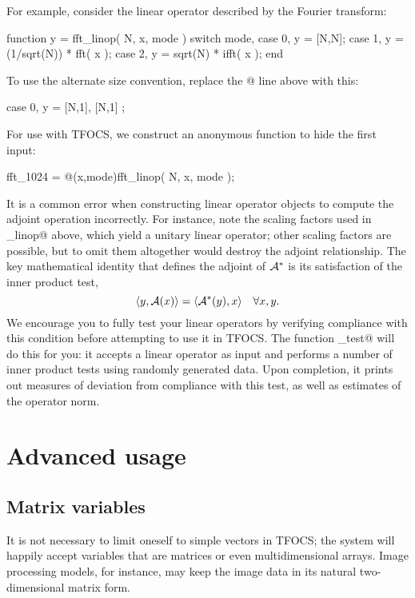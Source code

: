 \documentclass{article}
\begin{document}
For example, consider the linear operator described by the Fourier transform:
\begin{code}
	function y = fft_linop( N, x, mode )
	switch mode,
	case 0, y = [N,N];
	case 1, y = (1/sqrt(N)) * fft( x );
	case 2, y = sqrt(N) * ifft( x );
	end
\end{code}
To use the alternate size convention, replace the @ line above with this:
\begin{code}
	case 0, y = { [N,1], [N,1] };
\end{code}
For use with TFOCS, we construct an anonymous function to hide the first input:
\begin{code}
	fft_1024 = @(x,mode)fft_linop( N, x, mode );
\end{code}

It is a common error when constructing linear operator objects to compute
the adjoint operation incorrectly. For instance, note the scaling factors
used in \verb@fft_linop@ above, which yield a unitary linear operator;
other scaling factors are possible, but to omit them altogether would
destroy the adjoint relationship. The key mathematical identity that
defines the adjoint of $\mathcal{A}^*$ is its satisfaction of the inner product test,
\begin{equation}
	\langle y, \mathcal{A}(x) \rangle = \langle \mathcal{A}^*(y), x \rangle \quad \forall x,y.
\end{equation}
We encourage you to fully test your linear operators by verifying compliance
with this condition before attempting to use it in TFOCS.
The function \verb@linop_test@ will do this for you: it
accepts a linear operator as input
and performs a number of inner product tests using randomly generated data.
Upon completion, it prints out measures of deviation from compliance with
this test, as well as estimates of the operator norm.

\section{Advanced usage}
\label{sec:advanced}

\subsection{Matrix variables}
\label{sec:matvec}

It is not necessary to limit oneself to simple vectors in TFOCS;
the system will happily accept variables that are matrices or
even multidimensional arrays. Image processing
models, for instance,
may keep the image data in its natural two-dimensional  
matrix form.
\end{document}

